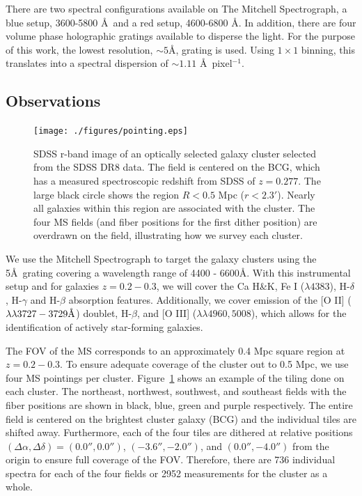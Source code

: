 There are two spectral configurations available on The Mitchell Spectrograph, a blue setup, 3600-5800 \AA\ and a red setup, 4600-6800 \AA. In addition, there are four volume phase holographic gratings available to disperse the light. For the purpose of this work, the lowest resolution, $\sim5$\AA, grating is used. Using $1\times1$ binning, this translates into a spectral dispersion of $\sim1.11$ \AA\ pixel$^{-1}$. 

\subsection{Observations} 
\begin{figure}
	\texttt{[image: ./figures/pointing.eps]} \caption{SDSS r-band image of an optically selected galaxy cluster selected from the SDSS DR8 data. The field is centered on the BCG, which has a measured spectroscopic redshift from SDSS of $z = 0.277$. The large black circle shows the region $R<0.5$ Mpc ($r<2.3'$). Nearly all galaxies within this region are associated with the cluster. The four MS fields (and fiber positions for the first dither position) are overdrawn on the field, illustrating how we survey each cluster.} \label{fig:tiles} 
\end{figure}

We use the Mitchell Spectrograph to target the galaxy clusters using the 5\AA\ grating covering a wavelength range of 4400 - 6600\AA. With this instrumental setup and for galaxies $z = 0.2-0.3$, we will cover the Ca H\&K, Fe I ($\lambda 4383$), H-$\delta$, H-$\gamma$ and H-$\beta$ absorption features. Additionally, we cover emission of the [O II] ($\lambda\lambda 3727-3729\hbox{\AA}$) doublet, H-$\beta$, and [O III] ($\lambda\lambda4960,5008$), which allows for the identification of actively star-forming galaxies.

The FOV of the MS corresponds to an approximately 0.4 Mpc square region at $z = 0.2-0.3$. To ensure adequate coverage of the cluster out to 0.5 Mpc, we use four MS pointings per cluster. Figure~\ref{fig:tiles} shows an example of the tiling done on each cluster. The northeast, northwest, southwest, and southeast fields with the fiber positions are shown in black, blue, green and purple respectively. The entire field is centered on the brightest cluster galaxy (BCG) and the individual tiles are shifted away. Furthermore, each of the four tiles are dithered at relative positions $(\Delta \alpha, \Delta \delta)=(0.0'',0.0'')$, $(-3.6'',-2.0'')$, and $(0.0'', -4.0'')$ from the origin to ensure full coverage of the FOV. Therefore, there are 736 individual spectra for each of the four fields or 2952 measurements for the cluster as a whole.


